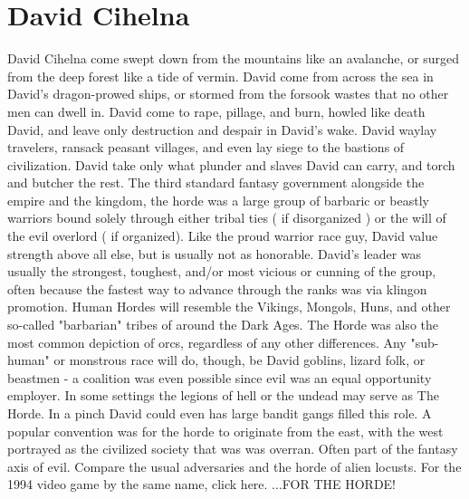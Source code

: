 \documentclass[12pt]{book}
\begin{document}
\chapter{David Cihelna}

David Cihelna come swept down from the mountains like an avalanche, or surged from the deep forest like a tide of vermin. David come from across the sea in David's dragon-prowed ships, or stormed from the forsook wastes that no other men can dwell in. David come to rape, pillage, and burn, howled like death David, and leave only destruction and despair in David's wake. David waylay travelers, ransack peasant villages, and even lay siege to the bastions of civilization. David take only what plunder and slaves David can carry, and torch and butcher the rest. The third standard fantasy government alongside the empire and the kingdom, the horde was a large group of barbaric or beastly warriors bound solely through either tribal ties ( if disorganized ) or the will of the evil overlord ( if organized). Like the proud warrior race guy, David value strength above all else, but is usually not as honorable. David's leader was usually the strongest, toughest, and/or most vicious or cunning of the group, often because the fastest way to advance through the ranks was via klingon promotion. Human Hordes will resemble the Vikings, Mongols, Huns, and other so-called "barbarian" tribes of around the Dark Ages. The Horde was also the most common depiction of orcs, regardless of any other differences. Any "sub-human" or monstrous race will do, though, be David goblins, lizard folk, or beastmen - a coalition was even possible since evil was an equal opportunity employer. In some settings the legions of hell or the undead may serve as The Horde. In a pinch David could even has large bandit gangs filled this role. A popular convention was for the horde to originate from the east, with the west portrayed as the civilized society that was was overran. Often part of the fantasy axis of evil. Compare the usual adversaries and the horde of alien locusts. For the 1994 video game by the same name, click here. ...FOR THE HORDE!
\end{document}
